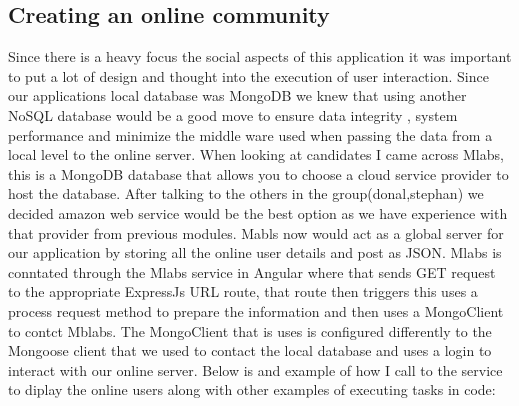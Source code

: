 \subsection{Creating an online community}
Since there is a heavy focus the social aspects of this application it was important to put a lot of design and thought into the execution of user interaction. Since our applications local database was MongoDB we knew that using another NoSQL database would be a good move to ensure data integrity , system performance and minimize the middle ware used when passing the data from a local level to the online server. When looking at candidates I came across Mlabs, this is a MongoDB database that allows you to choose a cloud service provider to host the database. After talking to the others in the group(donal,stephan) we decided amazon web service would be the best option as we have experience with that provider from previous modules. Mabls now would act as a global server for our application by storing all the online user details and post as JSON. Mlabs is conntated through the Mlabs service in Angular where that sends GET request to the appropriate ExpressJs URL route, that route then triggers this uses a process request method to prepare the information and then uses a MongoClient to contct Mblabs. The MongoClient that is uses is configured differently to the Mongoose client that we used to contact the local database and uses a login to interact with our online server. Below is and example of how I call to the service to diplay the online users along with other examples of executing tasks in code:
    
